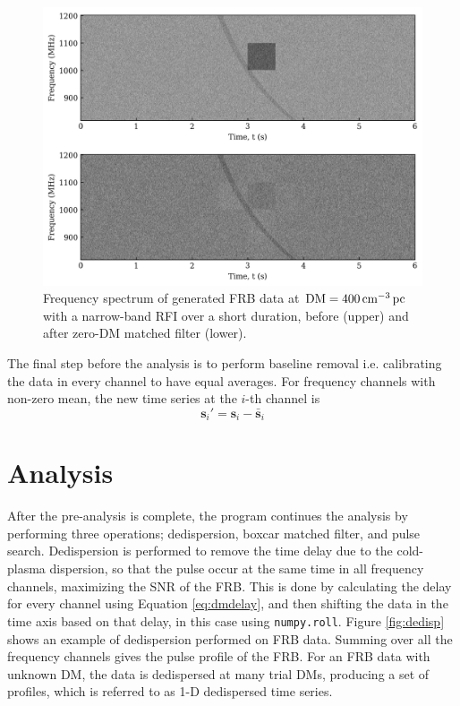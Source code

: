 \begin{figure}
    \centering
    \includegraphics[width=\textwidth]{Graphs/ZDMF.jpeg}
    \caption[Application of zero-DM matched filter]{Frequency spectrum of generated FRB data at $\text{DM}=400\,\text{cm}^{-3}\,\text{pc}$ with a narrow-band RFI over a short duration, before (upper) and after zero-DM matched filter (lower).}
    \label{fig:zdmf}
\end{figure}

The final step before the analysis is to perform baseline removal i.e. calibrating the data in every channel to have equal averages. For frequency channels with non-zero mean, the new time series at the $i$-th channel is
\begin{equation}
    \mathbf{s}_i' = \mathbf{s}_i - \bar{\mathbf{s}}_i
\end{equation}

\section{Analysis}

After the pre-analysis is complete, the program continues the analysis by performing three operations; dedispersion, boxcar matched filter, and pulse search. Dedispersion is performed to remove the time delay due to the cold-plasma dispersion, so that the pulse occur at the same time in all frequency channels, maximizing the SNR of the FRB. This is done by calculating the delay for every channel using Equation \ref{eq:dmdelay}, and then shifting the data in the time axis based on that delay, in this case using \texttt{numpy.roll}. Figure \ref{fig:dedisp} shows an example of dedispersion performed on FRB data. Summing over all the frequency channels gives the pulse profile of the FRB. For an FRB data with unknown DM, the data is dedispersed at many trial DMs, producing a set of profiles, which is referred to as 1-D dedispersed time series. 

